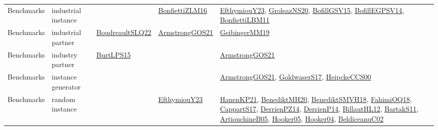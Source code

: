 {\begin{longtable}{lp{3cm}>{\raggedright}p{6cm}>{\raggedright}p{6cm}p{8cm}}
Benchmarks & industrial instance &  & \href{papers/BonfiettiZLM16.pdf}{BonfiettiZLM16}\cite{BonfiettiZLM16} & \href{papers/EfthymiouY23.pdf}{EfthymiouY23}\cite{EfthymiouY23}, \href{papers/GroleazNS20.pdf}{GroleazNS20}\cite{GroleazNS20}, \href{papers/BofillGSV15.pdf}{BofillGSV15}\cite{BofillGSV15}, \href{papers/BofillEGPSV14.pdf}{BofillEGPSV14}\cite{BofillEGPSV14}, \href{papers/BonfiettiLBM11.pdf}{BonfiettiLBM11}\cite{BonfiettiLBM11}\\
Benchmarks & industrial partner & \href{papers/BoudreaultSLQ22.pdf}{BoudreaultSLQ22}\cite{BoudreaultSLQ22} & \href{papers/ArmstrongGOS21.pdf}{ArmstrongGOS21}\cite{ArmstrongGOS21} & \href{papers/GeibingerMM19.pdf}{GeibingerMM19}\cite{GeibingerMM19}\\
Benchmarks & industry partner & \href{papers/BurtLPS15.pdf}{BurtLPS15}\cite{BurtLPS15} &  & \href{papers/ArmstrongGOS21.pdf}{ArmstrongGOS21}\cite{ArmstrongGOS21}\\
Benchmarks & instance generator &  &  & \href{papers/ArmstrongGOS21.pdf}{ArmstrongGOS21}\cite{ArmstrongGOS21}, \href{papers/GoldwaserS17.pdf}{GoldwaserS17}\cite{GoldwaserS17}, \href{articles/HeipckeCCS00.pdf}{HeipckeCCS00}\cite{HeipckeCCS00}\\
Benchmarks & random instance &  & \href{papers/EfthymiouY23.pdf}{EfthymiouY23}\cite{EfthymiouY23} & \href{papers/HanenKP21.pdf}{HanenKP21}\cite{HanenKP21}, \href{articles/BenediktMH20.pdf}{BenediktMH20}\cite{BenediktMH20}, \href{papers/BenediktSMVH18.pdf}{BenediktSMVH18}\cite{BenediktSMVH18}, \href{articles/FahimiOQ18.pdf}{FahimiOQ18}\cite{FahimiOQ18}, \href{papers/CappartS17.pdf}{CappartS17}\cite{CappartS17}, \href{papers/DerrienPZ14.pdf}{DerrienPZ14}\cite{DerrienPZ14}, \href{papers/DerrienP14.pdf}{DerrienP14}\cite{DerrienP14}, \href{papers/BillautHL12.pdf}{BillautHL12}\cite{BillautHL12}, \href{articles/BartakS11.pdf}{BartakS11}\cite{BartakS11}, \href{papers/ArtiouchineB05.pdf}{ArtiouchineB05}\cite{ArtiouchineB05}, \href{articles/Hooker05.pdf}{Hooker05}\cite{Hooker05}, \href{papers/Hooker04.pdf}{Hooker04}\cite{Hooker04}, \href{papers/BeldiceanuC02.pdf}{BeldiceanuC02}\cite{BeldiceanuC02}\\

\end{longtable}}
